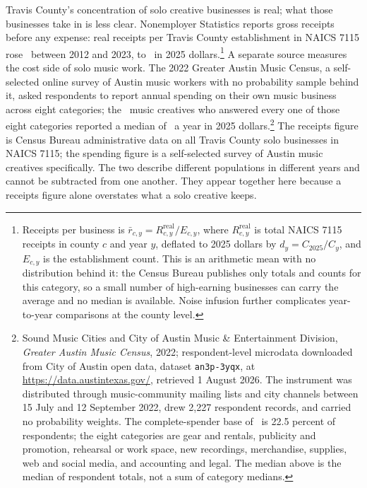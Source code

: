 Travis County's concentration of solo creative businesses is real; what
those businesses take in is less clear. Nonemployer Statistics reports
gross receipts before any expense: real receipts per Travis County
establishment in NAICS 7115 rose \NNesReceiptsPerEstabPctchgTravis\
between 2012 and 2023, to
\NNesReceiptsPerEstabTravisLast\ in 2025
dollars.\footnote{Receipts per business is
\(\bar{r}_{c,y} = R^{\mathrm{real}}_{c,y} / E_{c,y}\), where
\(R^{\mathrm{real}}_{c,y}\) is total NAICS 7115 receipts in county \(c\)
and year \(y\), deflated to 2025 dollars by \(d_y = C_{2025}/C_y\), and
\(E_{c,y}\) is the establishment count. This is an arithmetic mean with no
distribution behind it: the Census Bureau publishes only totals and counts
for this category, so a small number of high-earning businesses can carry
the average and no median is available. Noise infusion further complicates
year-to-year comparisons at the county level.} A separate source measures
the cost side of solo music work. The
2022 Greater Austin Music Census, a self-selected online survey of Austin
music workers with no probability sample behind it, asked respondents to
report annual spending on their own music business across eight categories;
the \NCensusSpendCompleteN\ music creatives who answered every one of those
eight categories reported a median of \NCensusSpendTotalMedian\ a year in
2025 dollars.\footnote{Sound Music Cities and City of Austin Music \&
Entertainment Division, \textit{Greater Austin Music Census}, 2022;
respondent-level microdata downloaded from City of Austin open data,
dataset \texttt{an3p-3yqx}, at
\url{https://data.austintexas.gov/}, retrieved 1 August 2026. The
instrument was distributed through music-community mailing lists and city
channels between 15 July and 12 September 2022, drew 2{,}227 respondent
records, and carried no probability weights. The complete-spender base of
\NCensusSpendCompleteN\ is 22.5 percent of respondents; the eight
categories are gear and rentals, publicity and promotion, rehearsal or
work space, new recordings, merchandise, supplies, web and social media,
and accounting and legal. The median above is the median of respondent
totals, not a sum of category medians.} The receipts figure is Census
Bureau administrative data on all Travis County solo businesses in NAICS
7115; the spending figure is a self-selected survey of Austin music
creatives specifically. The two describe different populations in
different years and cannot be subtracted from one another. They appear
together here because a receipts figure alone overstates what a solo
creative keeps.

